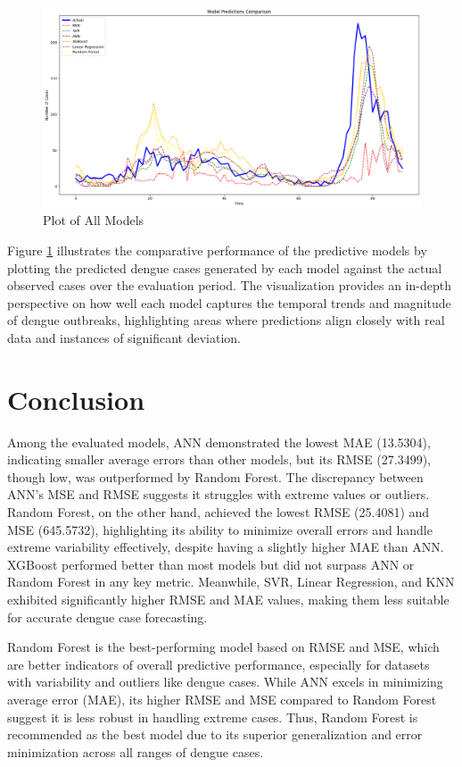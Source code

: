 \documentclass{article}
\begin{document}
\begin{figure}[h!]
    \centering
    \includegraphics[width=1\linewidth]{image/All model plot.png}
    \caption{Plot of All Models}
    \label{fig:all}
\end{figure}

Figure \ref{fig:all} illustrates the comparative performance of the predictive models by plotting the predicted dengue cases generated by each model against the actual observed cases over the evaluation period. The visualization provides an in-depth perspective on how well each model captures the temporal trends and magnitude of dengue outbreaks, highlighting areas where predictions align closely with real data and instances of significant deviation.

\section{Conclusion}
Among the evaluated models, ANN demonstrated the lowest MAE (13.5304), indicating smaller average errors than other models, but its RMSE (27.3499), though low, was outperformed by Random Forest. The discrepancy between ANN's MSE and RMSE suggests it struggles with extreme values or outliers. Random Forest, on the other hand, achieved the lowest RMSE (25.4081) and MSE (645.5732), highlighting its ability to minimize overall errors and handle extreme variability effectively, despite having a slightly higher MAE than ANN. XGBoost performed better than most models but did not surpass ANN or Random Forest in any key metric. Meanwhile, SVR, Linear Regression, and KNN exhibited significantly higher RMSE and MAE values, making them less suitable for accurate dengue case forecasting.

Random Forest is the best-performing model based on RMSE and MSE, which are better indicators of overall predictive performance, especially for datasets with variability and outliers like dengue cases.
While ANN excels in minimizing average error (MAE), its higher RMSE and MSE compared to Random Forest suggest it is less robust in handling extreme cases.
Thus, Random Forest is recommended as the best model due to its superior generalization and error minimization across all ranges of dengue cases.

\end{document}
